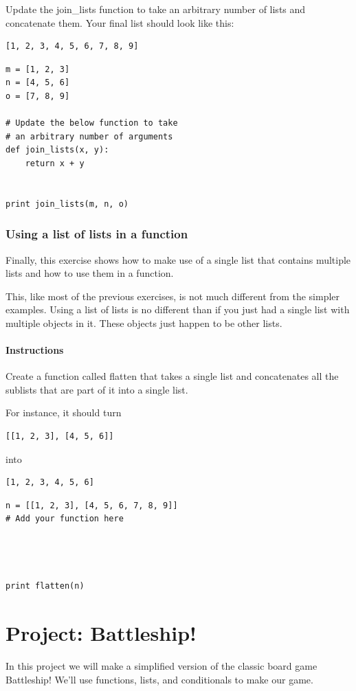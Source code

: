 \documentclass[12pt,a4paper,final,twoside,onecolumn,titlepage]{book}
\begin{document}
Update the join\_lists function to take an arbitrary number of lists and concatenate them. Your final list should look like this:
\begin{lstlisting}
[1, 2, 3, 4, 5, 6, 7, 8, 9]
\end{lstlisting}
\begin{lstlisting}
m = [1, 2, 3]
n = [4, 5, 6]
o = [7, 8, 9]

# Update the below function to take
# an arbitrary number of arguments
def join_lists(x, y):
    return x + y


print join_lists(m, n, o)
\end{lstlisting}

\subsection{Using a list of lists in a function}

Finally, this exercise shows how to make use of a single list that contains multiple lists and how to use them in a function.

This, like most of the previous exercises, is not much different from the simpler examples. Using a list of lists is no different than if you just had a single list with multiple objects in it. These objects just happen to be other lists.
\subsubsection{Instructions}

Create a function called flatten that takes a single list and concatenates all the sublists that are part of it into a single list.

For instance, it should turn
\begin{lstlisting}
[[1, 2, 3], [4, 5, 6]]
\end{lstlisting}
into
\begin{lstlisting}
[1, 2, 3, 4, 5, 6]
\end{lstlisting}

\begin{lstlisting}
n = [[1, 2, 3], [4, 5, 6, 7, 8, 9]]
# Add your function here




print flatten(n)
\end{lstlisting}

\chapter{Project: Battleship!}
In this project we will make a simplified version of the classic board game Battleship! We'll use functions, lists, and conditionals to make our game.
\end{document}
